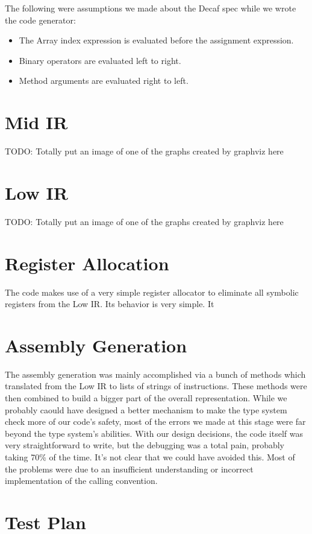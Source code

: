 \documentclass[11pt]{article}
\begin{document}
The following were assumptions we made about the Decaf spec while we
wrote the code generator: 

\begin{itemize}
\item The Array index expression is evaluated before the assignment expression. 
\item Binary operators are evaluated left to right. 
\item Method arguments are evaluated right to left. 
\end{itemize}

\section {Mid IR}
\label{sec:midir}

TODO: Totally put an image of one of the graphs created by graphviz here 

\section {Low IR} 
\label{sec:lowir}

TODO: Totally put an image of one of the graphs created by graphviz here 

\section {Register Allocation} 
\label{sec:regalloc}

The code makes use of a very simple register allocator to eliminate
all symbolic registers from the Low IR. Its behavior is very
simple. It 

\section {Assembly Generation}  
\label{sec:assembly}
The assembly generation was mainly accomplished via a bunch of methods which
translated from the Low IR to lists of strings of instructions. These methods
were then combined to build a bigger part of the overall representation. While
we probably caould have designed a better mechanism to make the type system
check more of our code's safety, most of the errors we made at this stage were
far beyond the type system's abilities. With our design decisions, the code
itself was very straightforward to write, but the debugging was a total pain,
probably taking 70\% of the time. It's not clear that we could have avoided
this. Most of the problems were due to an insufficient understanding or
incorrect implementation of the calling convention.

\section {Test Plan}
\end{document}
